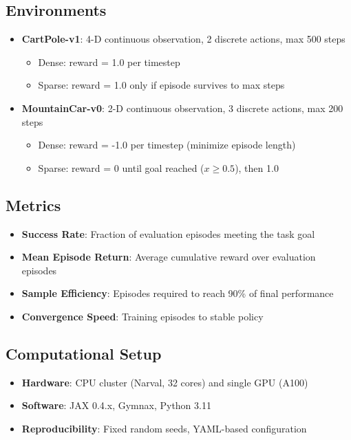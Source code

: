 \documentclass[conference]{IEEEtran}
\begin{document}
\subsection{Environments}
\begin{itemize}
  \item \textbf{CartPole-v1}: 4-D continuous observation, 2 discrete actions, max 500 steps
    \begin{itemize}
      \item Dense: reward = 1.0 per timestep
      \item Sparse: reward = 1.0 only if episode survives to max steps
    \end{itemize}
  \item \textbf{MountainCar-v0}: 2-D continuous observation, 3 discrete actions, max 200 steps
    \begin{itemize}
      \item Dense: reward = -1.0 per timestep (minimize episode length)
      \item Sparse: reward = 0 until goal reached ($x \geq 0.5$), then 1.0
    \end{itemize}
\end{itemize}

\subsection{Metrics}
\begin{itemize}
  \item \textbf{Success Rate}: Fraction of evaluation episodes meeting the task goal
  \item \textbf{Mean Episode Return}: Average cumulative reward over evaluation episodes
  \item \textbf{Sample Efficiency}: Episodes required to reach 90\% of final performance
  \item \textbf{Convergence Speed}: Training episodes to stable policy
\end{itemize}

\subsection{Computational Setup}
\begin{itemize}
  \item \textbf{Hardware}: CPU cluster (Narval, 32 cores) and single GPU (A100)
  \item \textbf{Software}: JAX 0.4.x, Gymnax, Python 3.11
  \item \textbf{Reproducibility}: Fixed random seeds, YAML-based configuration
\end{itemize}
\end{document}
